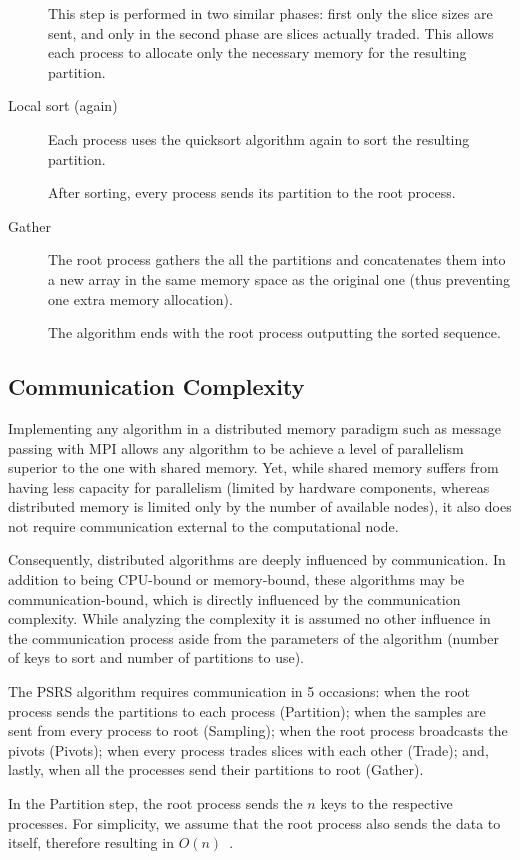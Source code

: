 \documentclass[abstract=on,9pt,twocolumn]{scrartcl}
\begin{document}
\begin{description}
{	This step is performed in two similar phases: first only the slice sizes are sent, and only in the second phase are slices actually traded. This allows each process to allocate only the necessary memory for the resulting partition.}
	\item[Local sort (again)]{Each process uses the quicksort algorithm again to sort the resulting partition.
	
	After sorting, every process sends its partition to the root process.}
	\item[Gather]{The root process gathers the all the partitions and concatenates them into a new array in the same memory space as the original one (thus preventing one extra memory allocation).
	
	The algorithm ends with the root process outputting the sorted sequence.}
\end{description}



\subsection{Communication Complexity}
Implementing any algorithm in a distributed memory paradigm such as message passing with MPI allows any algorithm to be achieve a level of parallelism superior to the one with shared memory. Yet, while shared memory suffers from having less capacity for parallelism (limited by hardware components, whereas distributed memory is limited only by the number of available nodes), it also does not require communication external to the computational node.

Consequently, distributed algorithms are deeply influenced by communication. In addition to being CPU-bound or memory-bound, these algorithms may be communication-bound, which is directly influenced by the communication complexity. While analyzing the complexity it is assumed no other influence in the communication process aside from the parameters of the algorithm (number of keys to sort and number of partitions to use).

The PSRS algorithm requires communication in 5 occasions: when the root process sends the partitions to each process (Partition); when the samples are sent from every process to root (Sampling); when the root process broadcasts the pivots (Pivots); when every process trades slices with each other (Trade); and, lastly, when all the processes send their partitions to root (Gather).

In the Partition step, the root process sends the $n$ keys to the respective processes. For simplicity, we assume that the root process also sends the data to itself, therefore resulting in $O(n)\enspace .$
\end{document}
